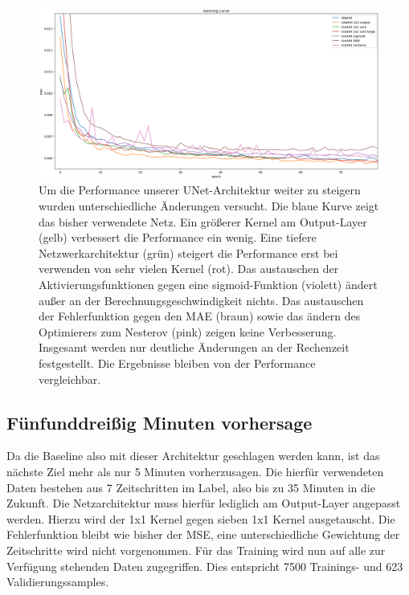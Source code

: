 \begin{figure}[h]
	\centering
	\includegraphics[width=\linewidth]{pics/vgl_lc_optim.png}
	\caption[Verschiedene UNet optimierungen im Vergleich.]{
		Um die Performance unserer UNet-Architektur weiter zu steigern wurden unterschiedliche Änderungen versucht. Die blaue Kurve zeigt das bisher verwendete Netz. Ein größerer Kernel am Output-Layer (gelb) verbessert die Performance ein wenig. Eine tiefere Netzwerkarchitektur (grün) steigert die Performance erst bei verwenden von sehr vielen Kernel (rot). Das austauschen der Aktivierungsfunktionen gegen eine sigmoid-Funktion (violett) ändert außer an der Berechnungsgeschwindigkeit nichts. Das austauschen der Fehlerfunktion gegen den MAE (braun) sowie das ändern des Optimierers zum Nesterov (pink) zeigen keine Verbesserung. Insgesamt werden nur deutliche Änderungen an der Rechenzeit festgestellt. Die Ergebnisse bleiben von der Performance vergleichbar.
		}
	\label{lc_unet_types}
\end{figure}

\subsection{Fünfunddreißig Minuten vorhersage}
Da die Baseline also mit dieser Architektur geschlagen werden kann, ist das nächste Ziel mehr als nur 5 Minuten vorherzusagen. Die hierfür verwendeten Daten bestehen aus 7 Zeitschritten im Label, also bis zu 35 Minuten in die Zukunft. Die Netzarchitektur muss hierfür lediglich am Output-Layer angepasst werden. Hierzu wird der 1x1 Kernel gegen sieben 1x1 Kernel ausgetauscht. Die Fehlerfunktion bleibt wie bisher der MSE, eine unterschiedliche Gewichtung der Zeitschritte wird nicht vorgenommen.
Für das Training wird nun auf alle zur Verfügung stehenden Daten zugegriffen. Dies entspricht 7500 Trainings- und 623 Validierungssamples.

